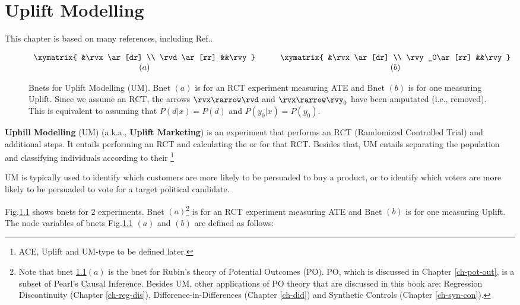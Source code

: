 \chapter{Uplift Modelling}
\label{ch-uplift}



This chapter is based 
on 
many references,
including Ref.\cite{uplift-2017, fei, wiki-uplift,jaros}.

\begin{figure}[h!]
$$\begin{array}{ccc}
\xymatrix{
&\rvx\ar[dr]
\\
\rvd\ar[rr]
&&\rvy
}
&\quad&
\xymatrix{
&\rvx\ar[dr]
\\
\rvy_0\ar[rr]
&&\rvy
}
\\
(a) &\quad & (b)
\end{array}
$$
\caption{Bnets for Uplift Modelling (UM). 
Bnet $(a)$ is for an RCT experiment measuring ATE and Bnet $(b)$ is for one measuring Uplift. 
 Since we assume an RCT, the arrows $\rvx\rarrow \rvd$ 
and $\rvx\rarrow \rvy_0$ have been amputated (i.e., removed). This is equivalent to assuming that $P(d|x)=P(d)$ and
$P(y_0|x)=P(y_0)$.
}
\label{fig-up-bnet}
\end{figure}



{\bf Uphill Modelling} (UM) (a.k.a., {\bf Uplift Marketing})
is an experiment that performs an
RCT (Randomized Controlled Trial) and additional steps. It 
entails performing an
RCT  and 
 calculating  the  or  for that  RCT.
 Besides that, UM entails separating 
 the population and classifying
individuals  according to their \footnote{ACE, Uplift and UM-type to be defined later.}

UM is typically used to identify which 
customers are more likely to be persuaded to buy a
product, or to identify which voters are more
likely to be persuaded to vote for a target political candidate.


Fig.\ref{fig-up-bnet} shows bnets for 2 experiments. Bnet $(a)$\footnote{
Note that bnet \ref{fig-up-bnet}$(a)$ 
is the bnet for Rubin's theory of 
Potential Outcomes (PO).
PO, which is
discussed in Chapter \ref{ch-pot-out},
 is a subset
of Pearl's Causal Inference.
Besides UM, other  applications of PO theory
that are discussed in this book 
are: Regression Discontinuity (Chapter \ref{ch-reg-dis}),
Difference-in-Differences (Chapter \ref{ch-did})
and Synthetic Controls (Chapter \ref{ch-syn-con}).} is for an RCT experiment measuring ATE and Bnet $(b)$ is for one measuring Uplift. 
The node variables of bnets Fig.\ref{fig-up-bnet}
$(a)$ and $(b)$
are defined as follows:

